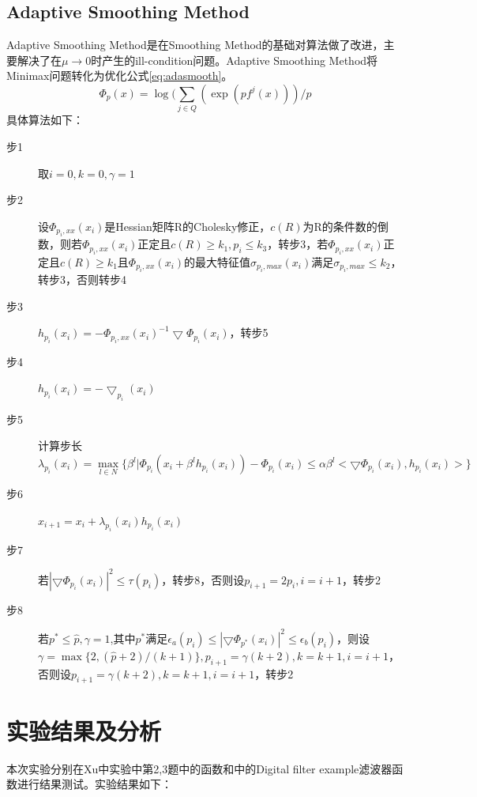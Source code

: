 \documentclass{ctexart}
\begin{document}
\subsection{Adaptive Smoothing Method}
Adaptive Smoothing Method是在Smoothing Method的基础对算法做了改进，主要解决了在$\mu\rightarrow 0$时产生的ill-condition问题。Adaptive Smoothing Method将Minimax问题转化为优化公式\ref{eq:adasmooth}。
\begin{equation}
\label{eq:adasmooth}
\Phi_p(x)=\log(\sum_{j\in Q}{(\exp(pf^j(x)))/p}
\end{equation}
具体算法如下：
\begin{description}
	\item[步1] 取$i=0,k=0,\gamma = 1$
	\item[步2] 设$\Phi_{p_i,xx}(x_i)$是Hessian矩阵R的Cholesky修正，$c(R)$为R的条件数的倒数，则若$\Phi_{p_i,xx}(x_i)$正定且$c(R)\geq k_1,p_i\leq k_3$，转步3，若$\Phi_{p_i,xx}(x_i)$正定且$c(R)\geq k_1$且$\Phi_{p_i,xx}(x_i)$的最大特征值$\sigma_{p_i,max}(x_i)$满足$\sigma_{p_i,max}\leq k_2$，转步3，否则转步4
	\item[步3] $h_{p_i}(x_i) = -\Phi_{p_i,xx}(x_i)^{-1}\bigtriangledown\Phi_{p_i}(x_i)$，转步5
	\item[步4] $h_{p_i}(x_i) = -\bigtriangledown_{p_i}(x_i)$
	\item[步5] 计算步长\\
	\[\lambda_{p_i}(x_i) = \max_{l\in N}\{\beta^l|\Phi_{p_i}(x_i+\beta^lh_{p_i}(x_i))-\Phi_{p_i}(x_i)\leq \alpha\beta^l<\bigtriangledown\Phi_{p_i}(x_i),h_{p_i}(x_i)>\}\]
\item[步6] $x_{i+1} = x_i + \lambda_{p_i}(x_i)h_{p_i}(x_i)$
\item[步7] 若$|\bigtriangledown\Phi_{p_i}(x_i)|^2\leq \tau(p_i)$，转步8，否则设$p_{i+1}=2p_i, i=i+1$，转步2
\item[步8] 若$p^*\leq \hat{p},\gamma=1$,其中$p^*$满足$\epsilon_a(p_i)\leq |\bigtriangledown\Phi_{p^*}(x_i)|^2\leq \epsilon_b(p_i)$，则设$\gamma=\max\{2,(\hat{p}+2)/(k+1)\}, p_{i+1}=\gamma(k+2),k=k+1, i=i+1$，否则设$p_{i+1}=\gamma(k+2),k=k+1,i=i+1$，转步2
\end{description}
\section{实验结果及分析}
本次实验分别在Xu\cite{Xu2001}中实验中第2,3题中的函数和\cite{Charalambous1979}中的Digital filter example滤波器函数进行结果测试。实验结果如下：
\end{document}

